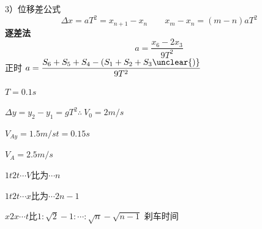 3）位移差公式
\[
\Delta x=aT^2=x_{n+1}-x_n\qquad x_m-x_n=(m-n)aT^2
\]
\textbf{逐差法}
\[
a=\frac{x_6-2x_3}{9T^2}
\]
正时 $a=\dfrac{S_6+S_5+S_4-(S_1+S_2+S_3\unclear{)}}{9T^2}$ %
\begin{problem}
$T=0.1\unit{s}$
\begin{solution}
$\Delta y=y_2-y_1=gT^2$\quad $\therefore\ V_0=2\unit{m/s}$

$V_{Ay}=1.5\unit{m/s}$\quad $t=0.15\unit{s}$

$V_A=2.5\unit{m/s}$
\end{solution}
\end{problem}
$1t$\quad $2t$\quad $\cdots$\quad $V$比为\quad $\cdots$\quad $n$

$1t$\quad $2t$\quad $\cdots$\quad $x$比为\quad $\cdots$\quad $2n-1$

$x$\quad $2x$\quad $\cdots$\quad $t$比\quad $1:\sqrt2-1:\cdots:\sqrt n-\sqrt{n-1}$
刹车时间

